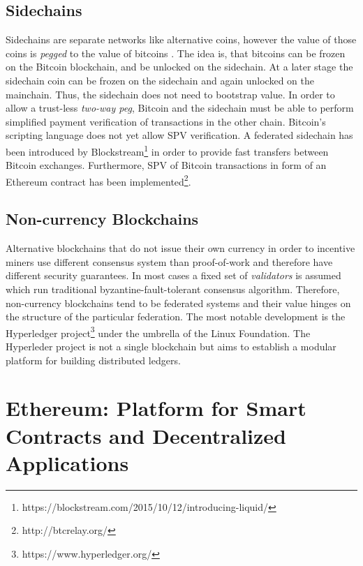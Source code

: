 \subsection{Sidechains}
Sidechains are separate networks like alternative coins, however the value of those coins is \emph{pegged} to the value of bitcoins \parencite{backenabling}. The idea is, that bitcoins can be frozen on the Bitcoin blockchain, and be unlocked on the sidechain. At a later stage the sidechain coin can be frozen on the sidechain and again unlocked on the mainchain. Thus, the sidechain does not need to bootstrap value.
In order to allow a trust-less \emph{two-way peg}, Bitcoin and the sidechain must be able to perform simplified payment verification of transactions in the other chain. Bitcoin's scripting language does not yet allow SPV verification. A federated sidechain has been introduced by Blockstream\footnote{https://blockstream.com/2015/10/12/introducing-liquid/} in order to provide fast transfers between Bitcoin exchanges. Furthermore, \ac{SPV} of Bitcoin transactions in form of an Ethereum contract has been implemented\footnote{http://btcrelay.org/}.

\subsection{Non-currency Blockchains}

Alternative blockchains that do not issue their own currency in order to incentive miners use different consensus system than proof-of-work and therefore have different security guarantees. In most cases a fixed set of \emph{validators} is assumed which run traditional byzantine-fault-tolerant consensus algorithm. Therefore, non-currency blockchains tend to be federated systems and their value hinges on the structure of the particular federation. The most notable development is the Hyperledger project\footnote{https://www.hyperledger.org/} under the umbrella of the Linux Foundation. The Hyperleder project is not a single blockchain but aims to establish a modular platform for building distributed ledgers.



\section{Ethereum: Platform for Smart Contracts and Decentralized Applications}
\label{sec:ethereum}

